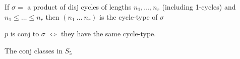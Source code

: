 If $\sigma = $ a product of disj cycles of lengths $n_1, \dotsc, n_r$ (including 1-cycles)
and $n_1 \le \dotsc \le n_r$ then $(n_1\ \dotsc\ n_r)$ is the cycle-type of $\sigma$

\begin{observation}
  $p$ is conj to $\sigma$ $\iff$ they have the same cycle-type.
\end{observation}

\begin{example}
  The conj classes in $S_5$
\end{example}